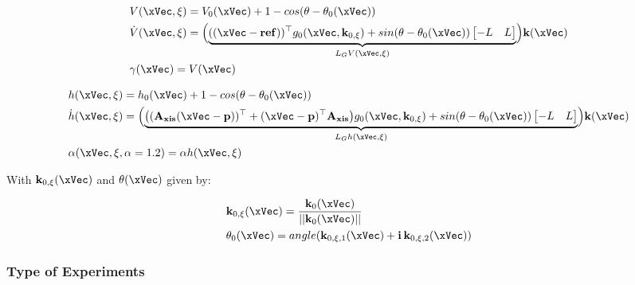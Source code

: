 \begin{subequations}
   \begin{align}
    &V(\xVec, \xi) = V_0(\xVec) + 1 - cos(\theta - \theta_0(\xVec)) \label{eq:V_unicycle} \\
    &\dot{V}(\xVec, \xi) = \Bigl(\underbrace{((\xVec-\mathbf{ref}))^{\top}g_0(\xVec, \mathbf{k}_{0,\xi}) + sin(\theta -\theta_0(\xVec))\begin{bmatrix} -L & L \end{bmatrix}}_{L_GV(\xVec, \xi)} \Bigr) \mathbf{k}(\xVec)  \label{eq:dot_V_unicycle} \\
    &\gamma(\xVec)  = V(\xVec) \label{eq:CLF_gamma_unicycle}
\end{align}
\label{eq:CLF_unicycle}
\end{subequations}

\begin{subequations}
   \begin{align}
    &h(\xVec, \xi) = h_0(\xVec) + 1 - cos(\theta - \theta_0(\xVec)) \label{eq:h_unicycle} \\
    &\dot{h}(\xVec, \xi) = \Bigl(\underbrace{\bigl((\mathbf{A_{xis}}(\xVec-\mathbf{p}))^{\top} + (\xVec-\mathbf{p})^{\top}\mathbf{A_{xis}}\bigr)g_0(\xVec, \mathbf{k}_{0,\xi}) + sin(\theta -\theta_0(\xVec))\begin{bmatrix} -L & L \end{bmatrix}}_{L_Gh(\xVec, \xi)} \Bigr) \mathbf{k}(\xVec)  \label{eq:dot_h_unicycle} \\
    &\alpha(\xVec, \xi, \alpha = 1.2)  = \alpha h(\xVec, \xi) \label{eq:CBF_alpha_unicycle}
\end{align}
\label{eq:CBF_unicycle}
\end{subequations}


With \(\mathbf{k}_{0,\xi}(\xVec)\) and \(\theta(\xVec)\) given by:

\begin{align}
    &\mathbf{k}_{0,\xi}(\xVec) = \frac{\mathbf{k}_0(\xVec) }{|| \mathbf{k}_0(\xVec) ||}      \\
    &\theta_0(\xVec) = angle(\mathbf{k}_{0,\xi,1}(\xVec) + \mathbf{i} \hspace{0.2em} \mathbf{k}_{0,\xi,2}(\xVec))
\end{align}


\subsubsection{Type of Experiments}
\label{subsubsec:unicyle_type_of_experiments}

